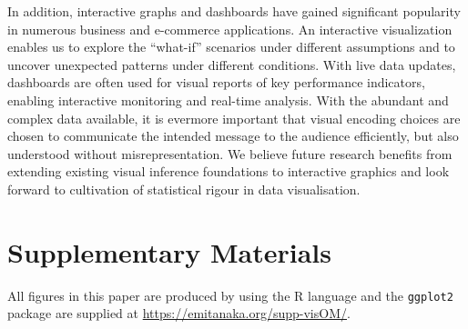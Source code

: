 \documentclass[ijds,nonblindrev]{informs-ijds}
\begin{document}
In addition, interactive graphs and dashboards have gained significant popularity in numerous business and e-commerce applications. An interactive visualization enables us to explore the “what-if” scenarios under different assumptions and to uncover unexpected patterns under different conditions. With live data updates, dashboards are often used for visual reports of key performance indicators, enabling interactive monitoring and real-time analysis. With the abundant and complex data available, it is evermore important that visual encoding choices are chosen to communicate the intended message to the audience efficiently, but also understood without misrepresentation. We believe future research benefits from extending existing visual inference foundations to interactive graphics \citep{Cook2021Foundation} and look forward to cultivation of statistical rigour in data visualisation.  



\section*{Supplementary Materials}\label{sec:supp}

All figures in this paper are produced by using the R language \citep{rstats} and the \texttt{ggplot2} package \citep{ggplot2} are supplied at \url{https://emitanaka.org/supp-visOM/}.


 
 
\end{document}
